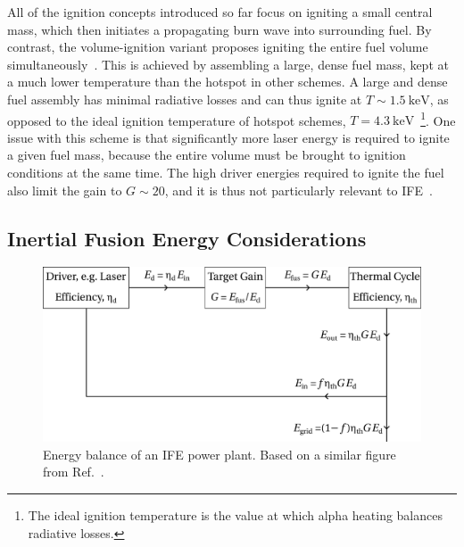 All of the ignition concepts introduced so far focus on igniting a small central mass, which then initiates a propagating burn wave into surrounding fuel.
By contrast, the volume-ignition variant proposes igniting the entire fuel volume simultaneously~\cite{khoda-bakhsh_advanced_1992,molvig_low_2016}.
This is achieved by assembling a large, dense fuel mass, kept at a much lower temperature than the hotspot in other schemes.
A large and dense fuel assembly has minimal radiative losses and can thus ignite at $T\sim1.5\ \text{keV}$, as opposed to the ideal ignition temperature of hotspot schemes, $T=4.3\ \text{keV}$~\cite{atzeni_physics_2004}\footnote{The ideal ignition temperature is the value at which alpha heating balances radiative losses.}.
One issue with this scheme is that significantly more laser energy is required to ignite a given fuel mass, because the entire volume must be brought to ignition conditions at the same time.
The high driver energies required to ignite the fuel also limit the gain to $G\sim20$, and it is thus not particularly relevant to \ac{IFE}~\cite{atzeni_physics_2004}.

\subsection{Inertial Fusion Energy Considerations}%
\label{sec:intro_IFE_gain}

\begin{figure}[t!]
    \includegraphics[width=0.8\linewidth]{Introduction/Images/IFE_powerplant.png}
    \centering
    \caption{Energy balance of an \ac{IFE} power plant.
    Based on a similar figure from Ref.~\cite{atzeni_physics_2004}.
    }%
    \label{fig:intro_IFE_energy_balance}
\end{figure}

